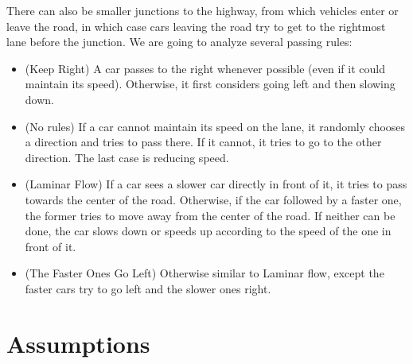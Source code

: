 \documentclass[12pt]{article}
\begin{document}
 There can also be smaller junctions  to the highway, from which vehicles enter or leave the road, in which case cars leaving the road try to get to the rightmost lane before the junction. We are going to  analyze several passing rules:\\


\begin{itemize}

\item (Keep Right) A car passes to the right whenever possible (even if it could maintain its speed). Otherwise, it first considers going left and then slowing down.

\item (No rules) If a car cannot maintain its speed on the lane, it  randomly chooses a direction and tries to pass there. If it cannot, it tries to go to the other direction. The last case is reducing speed. 

\item (Laminar Flow) If a car sees a slower car directly in front of it, it tries to pass towards the center of the road. Otherwise, if the car followed by a faster one, the former tries to move away from the center of the road. If neither can be done, the car slows down or speeds up according to the speed of the one in front of it.

\item (The Faster Ones Go Left)  Otherwise similar to Laminar flow, except the faster cars try to go left and the slower ones right.


\end{itemize}






\newpage




\section{Assumptions}
\end{document}
